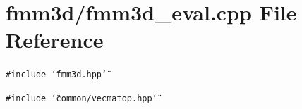 \section{fmm3d/fmm3d\_\-eval.cpp File Reference}
\label{fmm3d__eval_8cpp}


{\tt \#include \char`\"{}fmm3d.hpp\char`\"{}}\par
{\tt \#include \char`\"{}common/vecmatop.hpp\char`\"{}}\par
